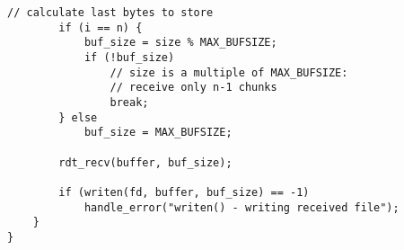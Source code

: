 \begin{lstlisting}[title=cmd\_commons.c]
		// calculate last bytes to store 
		if (i == n) {           
			buf_size = size % MAX_BUFSIZE;
			if (!buf_size)
				// size is a multiple of MAX_BUFSIZE:
				// receive only n-1 chunks
				break;          
		} else
			buf_size = MAX_BUFSIZE;
                                                                                              
		rdt_recv(buffer, buf_size);
                                                                                              
		if (writen(fd, buffer, buf_size) == -1)
			handle_error("writen() - writing received file");
	}
}
\end{lstlisting}
